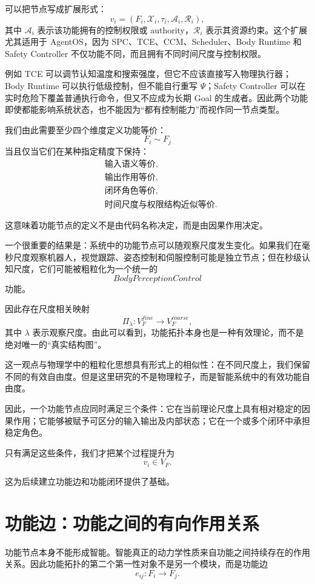 可以把节点写成扩展形式：
\[
v_i
=
\left(
F_i,
\mathcal X_i,
\tau_i,
\mathcal A_i,
\mathcal R_i
\right),
\]
其中 $\mathcal A_i$ 表示该功能拥有的控制权限或 authority，$\mathcal R_i$ 表示其资源约束。这个扩展尤其适用于 AgentOS，因为 SPC、TCE、CCM、Scheduler、Body Runtime 和 Safety Controller 不仅功能不同，而且拥有不同时间尺度与控制权限。

例如 TCE 可以调节认知温度和搜索强度，但它不应该直接写入物理执行器；Body Runtime 可以执行低级控制，但不能自行重写 $\Psi$；Safety Controller 可以在实时危险下覆盖普通执行命令，但又不应成为长期 Goal 的生成者。因此两个功能即使都能影响系统状态，也不能因为“都有控制能力”而视作同一节点类型。

我们由此需要至少四个维度定义功能等价：
\[
F_i\sim F_j
\]
当且仅当它们在某种指定精度下保持：
\[
\begin{aligned}
&\text{输入语义等价},\\
&\text{输出作用等价},\\
&\text{闭环角色等价},\\
&\text{时间尺度与权限结构近似等价}.
\end{aligned}
\]

这意味着功能节点的定义不是由代码名称决定，而是由因果作用决定。

一个很重要的结果是：系统中的功能节点可以随观察尺度发生变化。如果我们在毫秒尺度观察机器人，视觉跟踪、姿态控制和伺服控制可能是独立节点；但在秒级认知尺度，它们可能被粗粒化为一个统一的
\[
BodyPerceptionControl
\]
功能。

因此存在尺度相关映射
\[
\Pi_\lambda:
V_F^{fine}
\rightarrow
V_F^{coarse},
\]
其中 $\lambda$ 表示观察尺度。由此可以看到，功能拓扑本身也是一种有效理论，而不是绝对唯一的“真实结构图”。

这一观点与物理学中的粗粒化思想具有形式上的相似性：在不同尺度上，我们保留不同的有效自由度。但是这里研究的不是物理粒子，而是智能系统中的有效功能自由度。

因此，一个功能节点应同时满足三个条件：它在当前理论尺度上具有相对稳定的因果作用；它能够被赋予可区分的输入输出及内部状态；它在一个或多个闭环中承担稳定角色。

只有满足这些条件，我们才把某个过程提升为
\[
v_i\in V_F.
\]

这为后续建立功能边和功能闭环提供了基础。


\section{功能边：功能之间的有向作用关系}

功能节点本身不能形成智能。智能真正的动力学性质来自功能之间持续存在的作用关系。因此功能拓扑的第二个第一性对象不是另一个模块，而是功能边
\[
e_{ij}:F_i\rightarrow F_j.
\]

